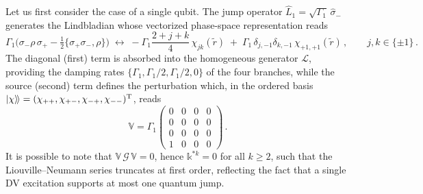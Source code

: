 \documentclass[%
reprint,
superscriptaddress,
nofootinbib,
 amsmath,amssymb,
prx,
floatfix,
]{revtex4-2}
\newcommand{\dket}[1]{\lvert #1 \rangle\!\rangle}
\begin{document}
Let us first consider the case of a single qubit. The jump operator $\hat{L}_1 = \sqrt{\Gamma_1}\, \hat{\sigma}_-$ generates the Lindbladian whose vectorized phase-space representation reads
\begin{equation}
    \Gamma_1 \Big( \sigma_-\rho\,\sigma_+ - \tfrac{1}{2}\{\sigma_+\sigma_-,\rho\} \Big) \;\longleftrightarrow\; -\Gamma_1 \frac{2+j+k}{4}\,\chi_{jk}(\tilde{r}) \;+\; \Gamma_1\,\delta_{j,-1}\delta_{k,-1}\,\chi_{+1,+1}(\tilde{r})\,, \qquad j,k \in \{\pm 1\}\,.
\end{equation}
The diagonal (first) term is absorbed into the homogeneous generator $\mathcal{L}$, providing the damping rates $\{\Gamma_1, \Gamma_1/2, \Gamma_1/2, 0\}$ of the four branches, while the source (second) term defines the perturbation which, in the ordered basis $\dket{\chi} = (\chi_{++}, \chi_{+-}, \chi_{-+}, \chi_{--})^{\rm T}$, reads
\begin{equation}
    \mathds{V} = \Gamma_1 \begin{pmatrix} 0&0&0&0 \\ 0&0&0&0 \\ 0&0&0&0 \\ 1&0&0&0 \end{pmatrix}\,.
\end{equation}
It is possible to note that $\mathds{V}\,\mathcal{G}\,\mathds{V} = 0$, hence $\mathds{k}^{*k} = 0$ for all $k \geq 2$, such that the Liouville--Neumann series truncates at first order, reflecting the fact that a single DV excitation supports at most one quantum jump. 
\end{document}
